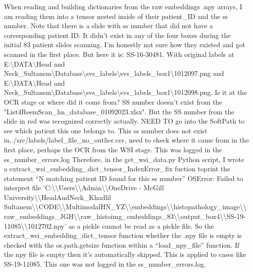 \documentclass{article}%
\begin{document}
\newline%
\newline%
%
When reading and building dictionaries from the raw embeddings .npy arrays, I am reading them into a tensor nested inside of their patient\_ID and the ss number. Note that there is a slide with ss number that did not have a corresponding patient ID. It didn’t exist in any of the four boxes during the initial 83 patient slides scanning. I’m honestly not sure how they existed and got scanned in the first place. But here it is: SS{-}16{-}30481. With original labels at E:\textbackslash{}DATA\textbackslash{}Head and Neck\_Sultanem\textbackslash{}Database\textbackslash{}svs\_labels\textbackslash{}svs\_labels\_box1\textbackslash{}1012097.png and E:\textbackslash{}DATA\textbackslash{}Head and Neck\_Sultanem\textbackslash{}Database\textbackslash{}svs\_labels\textbackslash{}svs\_labels\_box1\textbackslash{}1012098.png. Is it at the OCR stage or where did it come from? SS number doesn't exist from the "List4ReemScan\_hn\_database\_01092023.xlsx". But the SS number from the slide in red was recognized correctly actually. NEED TO go into the SoftPath to see which patient this one belongs to. This ss number does not exist in../src/labels/label\_file\_no\_outlier.csv, need to check where it came from in the first place, perhaps the OCR from the WSI stage. This was logged in the ss\_number\_errors.log%
\newline%
\newline%
%
Therefore, in the get\_wsi\_data.py Python script, I wrote a  extract\_wsi\_embedding\_dict\_tensor\_IndexError\_fix fuction toprint the statement “N matching patient ID found for this ss number”%
\newline%
\newline%
%
OSError: Failed to interpret file 'C:\textbackslash{}\textbackslash{}Users\textbackslash{}\textbackslash{}Admin\textbackslash{}\textbackslash{}OneDrive {-} McGill University\textbackslash{}\textbackslash{}HeadAndNeck\_Khadlil Sultanem\textbackslash{}\textbackslash{}CODE\textbackslash{}\textbackslash{}MultimodalHN\_YZ\textbackslash{}\textbackslash{}embeddings\textbackslash{}\textbackslash{}histopathology\_image\textbackslash{}\textbackslash{}raw\_embeddings\_JGH\textbackslash{}\textbackslash{}raw\_histoimg\_embeddings\_83\textbackslash{}\textbackslash{}output\_box4\textbackslash{}\textbackslash{}SS{-}19{-}11085\textbackslash{}\textbackslash{}1012702.npy' as a pickle cannot be read as a pickle file. So the extract\_wsi\_embedding\_dict\_tensor function whether the .npy file is empty is checked with the os.path.getsize function within a “load\_npy\_file” function. If the npy file is empty then it’s automatically skipped. This is applied to cases like SS{-}19{-}11085. This one was not logged in the ss\_number\_errors.log. %
\end{document}
